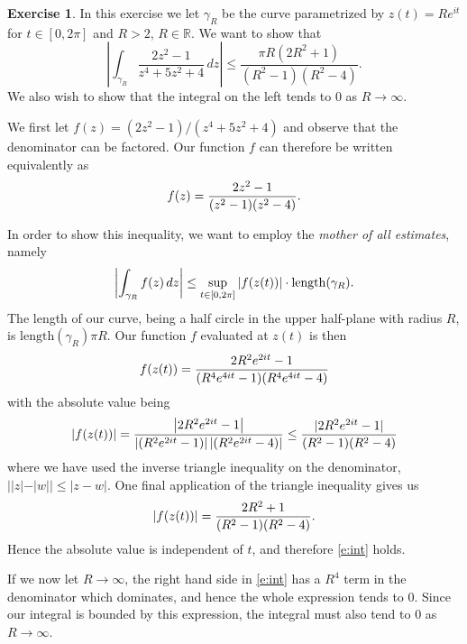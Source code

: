 \documentclass[10pt]{amsart}
\newcommand{\R}{\mathbb{R}}
\theoremstyle{definition}
\newtheorem{exercise}{Exercise}
\begin{document}
\begin{exercise}
  In this exercise we let $\gamma_R$ be the curve parametrized by $z(t) = Re^{it}$ for $t \in [0, 2\pi]$ and $R > 2$, $R \in \R$.
  We want to show that
  \begin{equation}
    \label{e:int}
    \left| \int_{\gamma_R} \frac{2z^2 - 1}{z^4 + 5z^2 + 4}\, dz \right| \leq \frac{\pi R(2R^2 + 1)}{(R^2 - 1)(R^2-4)}.
  \end{equation}
  We also wish to show that the integral on the left tends to 0 as $R \to \infty$.

We first let $f(z) = (2z^2 - 1)/(z^4 + 5z^2 + 4)$ and observe that the denominator can be factored. Our function $f$ can therefore be written equivalently
  as \begin{equation}
    \notag
    f(z) = \frac{2z^2 - 1}{(z^2 - 1)(z^2 -4)}.
  \end{equation}
  
  In order to show this inequality, we want to employ the \emph{mother of all estimates}, namely
  \begin{equation}
    \notag
    \left| \int_{\gamma_R} f(z) \, dz \right| \leq \sup_{t \in [0, 2\pi]} \left| f(z(t)) \right| \cdot \mathrm{length}(\gamma_R).
  \end{equation}
  The length of our curve, being a half circle in the upper half-plane with radius $R$, is $\mathrm{length}(\gamma_R) \pi R$.
  Our function $f$ evaluated at $z(t)$ is then
  \begin{equation}
    \notag
    f(z(t)) = \frac{2R^2e^{2it} - 1}{(R^4e^{4it} - 1)(R^4e^{4it} - 4)}
  \end{equation}
  with the absolute value being
  \begin{equation}
    \notag
    |f(z(t))| = \frac{\left|2R^2e^{2it} - 1\right|}{\left|(R^2e^{2it} - 1)\right|\left|(R^2e^{2it} - 4)\right|} \leq \frac{|2R^2e^{2it} - 1|}{(R^2 - 1)(R^2 - 4)}
  \end{equation}
  where we have used the inverse triangle inequality on the denominator, ${||z|-|w|| \leq |z - w|}$. One final application of the triangle inequality gives us
  \begin{equation}
    \notag
    |f(z(t))| = \frac{2R^2 + 1}{(R^2 - 1)(R^2 - 4)}.
  \end{equation}
  Hence the absolute value is independent of $t$, and therefore \cref{e:int} holds.
  
  If we now let $R \to \infty$, the right hand side in \cref{e:int} has a $R^4$
  term in the denominator which dominates, and hence the whole expression tends
  to $0$. Since our integral is bounded by this expression, the integral must
  also tend to $0$ as $R \to \infty$.
\end{exercise}
\end{document}
